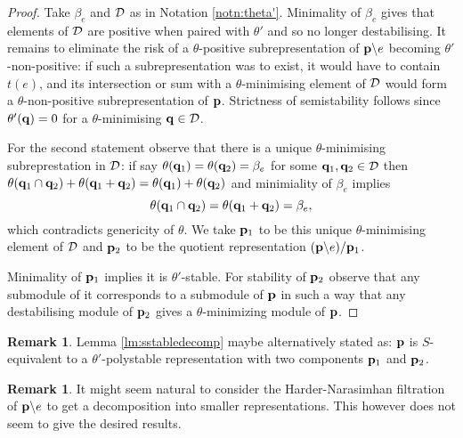 \documentclass{amsart}
\theoremstyle{definition}
\newtheorem{rem}[thm]{Remark}
\begin{document}
\begin{proof}
Take $\beta_e$ and $\mathcal{D}$ as in Notation \ref{notn:theta'}.
Minimality of $\beta_e$ gives that elements of $\mathcal{D}$ are positive when paired with $\theta'$ and so no longer destabilising.
It remains to eliminate the risk of a $\theta$-positive subrepresentation of $\mathbf{p} \backslash e$ becoming $\theta'$-non-positive: if such a subrepresentation was to exist, it would have to contain $t(e)$, and its intersection or sum with a $\theta$-minimising element of $\mathcal{D}$ would form a $\theta$-non-positive subrepresentation of $\mathbf{p}$.
Strictness of semistability follows since $\theta'(\mathbf{q})=0$ for a $\theta$-minimising $\mathbf{q} \in \mathcal{D}$.

For the second statement observe that there is a unique $\theta$-minimising subreprestation in $\mathcal{D}$: if say $\theta(\mathbf{q}_1) =\theta(\mathbf{q}_2)=\beta_e$ for some $\mathbf{q}_1, \mathbf{q}_2 \in \mathcal{D}$ then $\theta(\mathbf{q}_1\cap \mathbf{q}_2) + \theta(\mathbf{q}_1+ \mathbf{q}_2)=\theta(\mathbf{q}_1)+\theta(\mathbf{q}_2)$ and minimiality of $\beta_e$ implies 
$$\theta(\mathbf{q}_1\cap \mathbf{q}_2)=\theta(\mathbf{q}_1+ \mathbf{q}_2)=\beta_e,$$
which contradicts genericity of $\theta$.
We take $\mathbf{p}_1$ to be this unique $\theta$-minimising element of $\mathcal{D}$ and $\mathbf{p}_2$ to be the quotient representation $(\mathbf{p} \backslash e)/\mathbf{p}_1$.

Minimality of $\mathbf{p}_1$ implies it is $\theta'$-stable.
For stability of $\mathbf{p}_2$ observe that any submodule of it corresponds to a submodule of $\mathbf{p}$ in such a way that any destabilising module of $\mathbf{p}_2$ gives a $\theta$-minimizing module of $\mathbf{p}$.
\end{proof}

\begin{rem}
Lemma \ref{lm:sstabledecomp} maybe alternatively stated as: $\mathbf{p}$ is $S$-equivalent to a $\theta'$-polystable representation with two components $\mathbf{p}_1$ and $\mathbf{p}_2$.
\end{rem}

\begin{rem}
It might seem natural to consider the Harder-Narasimhan filtration of $\mathbf{p} \backslash e$ to get a decomposition into smaller representations.
This however does not seem to give the desired results.
\end{rem}
\end{document}
